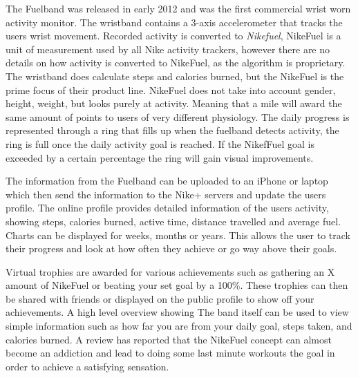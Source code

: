 
The Fuelband\cite{fuelBand} was released in early 2012 and was the first commercial wrist worn activity monitor. The wristband contains a 3-axis accelerometer that tracks the users wrist movement. Recorded activity is converted to \emph{Nikefuel}, NikeFuel\cite{nikefuel} is a unit of measurement used by all Nike activity trackers, however there are no details on how activity is converted to NikeFuel, as the algorithm is proprietary. The wristband does calculate steps and calories burned, but the NikeFuel is the prime focus of their product line. NikeFuel does not take into account gender, height, weight, but looks purely at activity. Meaning that a mile will award the same amount of points to users of very different physiology. The daily progress is represented through a ring that fills up when the fuelband detects activity, the ring is full once the daily activity goal is reached. If the NikefFuel goal is exceeded by a certain percentage the ring will gain visual improvements. 


The information from the Fuelband can be uploaded to an iPhone or laptop which then send the information to the Nike+ servers and update the users profile. The online profile provides detailed information of the users activity, showing steps, calories burned, active time, distance travelled and average fuel. Charts can be displayed for weeks, months or years. This allows the user to track their progress and look at how often they achieve or go way above their goals.\cite{fuelbandTechSpce} 
 
 
Virtual trophies are awarded for various achievements such as gathering an X amount of NikeFuel or beating your set goal by a 100\%. These trophies can then be shared with friends or displayed on the public profile to show off your achievements. A high level overview showing  The band itself can be used to view simple information such as how far you are from your daily goal, steps taken, and calories burned. A review has reported that the NikeFuel concept can almost become an addiction and lead to doing some last minute workouts the goal in order to achieve a satisfying sensation. \cite{fuelbandDcRain}

